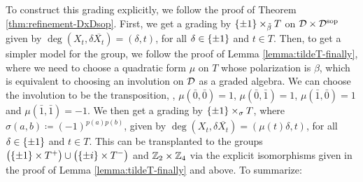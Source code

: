 To construct this grading explicitly, we follow the proof of Theorem \ref{thm:refinement-DxDsop}. 
First, we get a grading by $\{ \pm 1 \} \times_{\tilde\beta} T$ on $\mathcal{D}\times \mathcal{D}^{\mathrm{sop}}$ given by $\deg (X_t, \delta \overline{X_t}) = (\delta, t)$, for all $\delta \in \{ \pm 1 \}$ and $t\in T$. 
Then, to get a simpler model for the group, we follow the proof of Lemma \ref{lemma:tildeT-finally}, where we need to choose a quadratic form $\mu$ on $T$ whose polarization is $\beta$, which is equivalent to choosing an involution on $\mathcal{D}$ as a graded algebra. 
We can choose the involution to be the transposition, \ie, $\mu(\bar 0, \bar 0) = 1$, $\mu(\bar 0, \bar 1) = 1$, $\mu(\bar 1, \bar 0) = 1$ and $\mu(\bar 1, \bar 1) = -1$. 
We then get a grading by $\{ \pm 1 \} \times_\sigma T$, where $\sigma(a,b) \coloneqq (-1)^{p(a)p(b)}$, given by $\deg (X_t, \delta \overline{X_t}) = (\mu(t) \delta, t)$, for all $\delta \in \{ \pm 1 \}$ and $t\in T$. 
This can be transplanted to the groups $\big(\{ \pm 1 \} \times T^+\big) \cup \big(\{\pm i\} \times T^-\big)$ and $\mathbb{Z}_2\times \mathbb{Z}_4$ via the explicit isomorphisms given in the proof of Lemma \ref{lemma:tildeT-finally} and above. 
To summarize:

